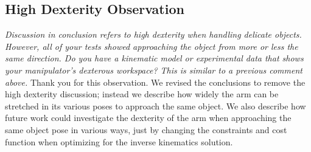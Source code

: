 \documentclass[letterpaper, 10 pt, twocolumn, conference]{article}
\begin{document}
\subsection{High Dexterity Observation}
\textit{Discussion in conclusion refers to high dexterity when handling delicate objects. However, all of your tests showed approaching the object from more or less the same direction. Do you have a kinematic model or experimental data that shows your manipulator's dexterous workspace? This is similar to a previous comment above.}
%
Thank you for this observation. We revised the conclusions to remove the high dexterity discussion; instead we describe how widely the arm can be stretched in its various poses to approach the same object. We also describe how future work could investigate the dexterity of the arm when approaching the same object pose in various ways, just by changing the constraints and cost function when optimizing for the inverse kinematics solution.
%

%
\end{document}
